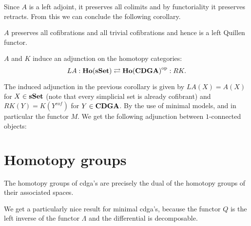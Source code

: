 Since $A$ is a left adjoint, it preserves all colimits and by functoriality it preserves retracts. From this we can conclude the following corollary.

\begin{corollary}
	$A$ preserves all cofibrations and all trivial cofibrations and hence is a left Quillen functor.
\end{corollary}

\begin{corollary}
	$A$ and $K$ induce an adjunction on the homotopy categories:
	$$ LA : \mathbf{Ho}(\mathbf{s{\mathbf{Set}}}) \rightleftarrows {\mathbf{Ho}(\mathbf{CDGA})}^{\text{op}} : RK. $$
\end{corollary}

The induced adjunction in the previous corollary is given by $LA(X) = A(X)$ for $X \in \mathbf{s{\mathbf{Set}}}$ (note that every simplicial set is already cofibrant) and $RK(Y) = K(Y^{cof})$ for $Y \in \mathbf{CDGA}$. By the use of minimal models, and in particular the functor $M$. We get the following adjunction between $1$-connected objects:



\section{Homotopy groups}
The homotopy groups of cdga's are precisely the dual of the homotopy groups of their associated spaces.


We get a particularly nice result for minimal cdga's, because the functor $Q$ is the left inverse of the functor $\Lambda$ and the differential is decomposable.

